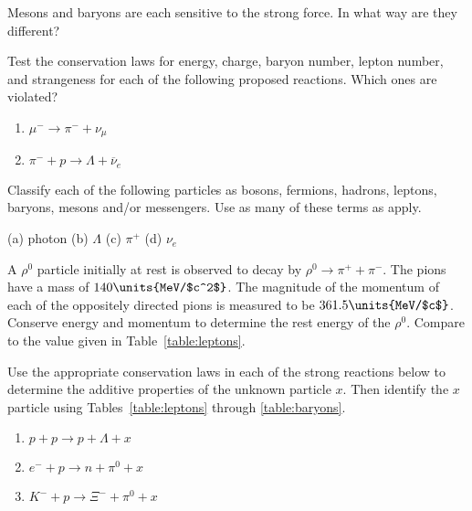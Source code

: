 \begin{problem}
Mesons and baryons are each sensitive to the strong force.  In
  what way are they different?
\label{prob:mesons_vs_baryons}
\end{problem}

\begin{problem}
Test the conservation laws for energy, charge, baryon number,
  lepton number, and strangeness %
for each
  of the following proposed reactions.  Which ones are violated?
  \begin{enumerate}
  \item $\mu^- \to \pi^- + \nu_\mu$
  \item $\pi^- + p \to \Lambda + \overline\nu_e$
  \end{enumerate}
\label{prob:conservation_laws_i}
\end{problem}


\begin{problem}
Classify each of the following particles as bosons, fermions,
  hadrons, leptons, baryons, mesons and/or messengers.  Use as many of
  these terms as apply.\par\medskip
  (a) photon \qquad \qquad
  (b) $\Lambda$ \qquad \qquad
  (c) $\pi^+$ \qquad \qquad
  (d) $\nu_e$
\label{prob:classify_particles}
\end{problem}

\begin{problem}
A $\rho^0$ particle initially at rest is observed to decay by
  $\rho^0 \to \pi^+ + \pi^-$.  The pions have a mass of 
  $140\units{MeV/$c^2$}$.  The magnitude of the momentum of each 
  of the oppositely directed pions is measured to be 
  $361.5\units{MeV/$c$}$.  Conserve energy
  and momentum to determine the rest energy of the $\rho^0$.  Compare
  to the value given in Table~\ref{table:leptons}.
\label{prob:rho0_rest_energy}
\end{problem}

\begin{problem}
Use the appropriate conservation laws in each of the strong
  reactions below to determine the additive properties of the unknown
  particle $x$.  Then identify the $x$ particle using
  Tables~\ref{table:leptons} through \ref{table:baryons}.
  \begin{enumerate}
  \item $p + p \to p + \Lambda + x$
  \item $e^- + p \to n + \pi^0 + x$
  \item $K^- + p \to \Xi^- + \pi^0 + x$
  \end{enumerate}
\label{prob:identify_particle_x}
\end{problem}

